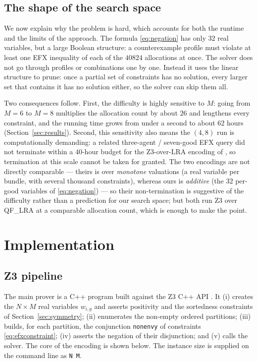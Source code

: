 \documentclass[11pt,a4paper]{article}
\theoremstyle{definition}
\theoremstyle{plain}
\newcommand{\EFX}{\textsf{EFX}}
\newcommand{\agents}{N}
\newcommand{\goods}{M}
\begin{document}
\subsection{The shape of the search space}
\label{sec:searchspace}

We now explain why the problem is hard, which accounts for both the runtime and
the limits of the approach. The formula \eqref{eq:negation}
has only $32$ real variables, but a large Boolean structure: a counterexample
profile must violate at least one \EFX{} inequality of each of the $40824$
allocations at once. The solver does not go through profiles or
combinations one by one. Instead it uses the linear structure to prune: once a
partial set of constraints has no solution, every larger set that contains it has
no solution either, so the solver can skip them all.

Two consequences follow. First, the difficulty is highly sensitive to $\goods$:
going from $\goods=6$ to $\goods=8$ multiplies the allocation count by about $26$
and lengthens every constraint, and the running time grows from under a second to
about $62$ hours (Section~\ref{sec:results}). Second, this sensitivity also means
the $(4,8)$ run is computationally demanding: a related three-agent /
seven-good \EFX{} query did not terminate within a $40$-hour budget for the
Z3-over-LRA encoding of \cite{AkramiEtAl2026}, so termination at this scale cannot be
taken for granted. The two encodings are not directly comparable --- theirs is over
\emph{monotone} valuations (a real variable per bundle, with several thousand
constraints), whereas ours is \emph{additive} (the $32$ per-good variables of
\eqref{eq:negation}) --- so their non-termination is suggestive of the difficulty
rather than a prediction for our search space; but both run Z3 over QF\_LRA at a
comparable allocation count, which is enough to make the point.

\section{Implementation}
\label{sec:impl}

\subsection{Z3 pipeline}

The main prover is a C++ program built against the Z3 C++ API
\cite{deMouraBjorner2008}. It (i) creates the $\agents\times\goods$ real
variables $w_{i,g}$ and asserts positivity and the sortedness constraints of
Section~\ref{sec:symmetry}; (ii) enumerates the non-empty ordered partitions;
(iii) builds, for each partition, the conjunction \texttt{nonenvy} of
constraints \eqref{eq:efxconstraint}; (iv) asserts the negation of their
disjunction; and (v) calls the solver. The core of the encoding is shown below.
The instance size is supplied on the command line as \texttt{N M}.
\end{document}
